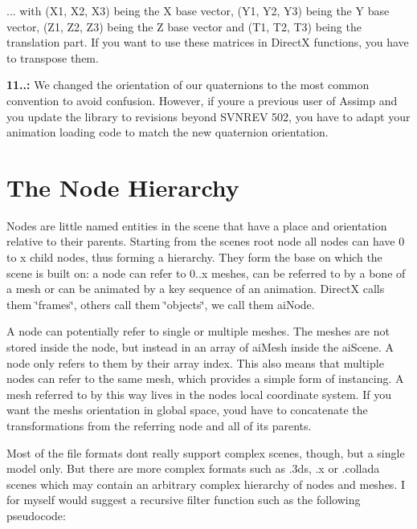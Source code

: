 ... with (X1, X2, X3) being the X base vector, (Y1, Y2, Y3) being the Y base vector, (Z1, Z2, Z3) being the Z base vector and (T1, T2, T3) being the translation part. If you want to use these matrices in Direct\+X functions, you have to transpose them.





{\bfseries 11..\+:} We changed the orientation of our quaternions to the most common convention to avoid confusion. However, if you\textquotesingle{}re a previous user of Assimp and you update the library to revisions beyond S\+V\+N\+R\+E\+V 502, you have to adapt your animation loading code to match the new quaternion orientation.



\hypertarget{data_hierarchy}{}\section{The Node Hierarchy}\label{data_hierarchy}
Nodes are little named entities in the scene that have a place and orientation relative to their parents. Starting from the scene\textquotesingle{}s root node all nodes can have 0 to x child nodes, thus forming a hierarchy. They form the base on which the scene is built on\+: a node can refer to 0..x meshes, can be referred to by a bone of a mesh or can be animated by a key sequence of an animation. Direct\+X calls them \char`\"{}frames\char`\"{}, others call them \char`\"{}objects\char`\"{}, we call them ai\+Node.

A node can potentially refer to single or multiple meshes. The meshes are not stored inside the node, but instead in an array of ai\+Mesh inside the ai\+Scene. A node only refers to them by their array index. This also means that multiple nodes can refer to the same mesh, which provides a simple form of instancing. A mesh referred to by this way lives in the node\textquotesingle{}s local coordinate system. If you want the mesh\textquotesingle{}s orientation in global space, you\textquotesingle{}d have to concatenate the transformations from the referring node and all of its parents.

Most of the file formats don\textquotesingle{}t really support complex scenes, though, but a single model only. But there are more complex formats such as .3ds, .x or .collada scenes which may contain an arbitrary complex hierarchy of nodes and meshes. I for myself would suggest a recursive filter function such as the following pseudocode\+:


